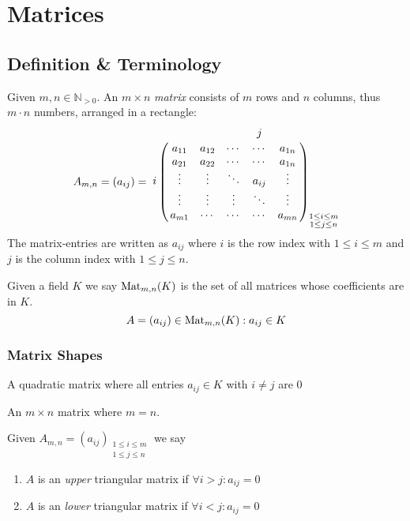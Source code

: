 \section{Matrices}
\subsection{Definition \& Terminology}
\begin{definition}[Matrix]
   Given \(m, n \in \mathbb{N}_{>0}\). An \(m \times n\) \emph{matrix} consists of \(m\) rows and \(n\) columns, thus \(m \cdot n\) numbers, arranged in a rectangle:
   \[
   A_{m,n} = (a_{ij}) =
   \bordermatrix{
      ~ & & & & j & \cr
        & a_{11} & a_{12} & \cdots & \cdots & a_{1n} \cr
        & a_{21} & a_{22} & \cdots & \cdots & a_{1n} \cr
      i & \vdots & \vdots & \ddots & a_{ij} & \vdots \cr
        & \vdots & \vdots & \vdots & \ddots & \vdots \cr
        & a_{m1} & \cdots & \cdots & \cdots & a_{mn} \cr
   }_{\substack{1 \leq i \leq m \\ 1 \leq j \leq n}}
   \]
   The matrix-entries are written as \(a_{ij}\) where \(i\) is the row index with \(1 \leq i \leq m\) and \(j\) is the column index with \(1 \leq j \leq n\).
\end{definition}
\begin{remark}[Notation]
   Given a field \(K\) we say \(\operatorname{Mat}_{m,n}(K)\) is the set of all matrices whose coefficients are in \(K\).
   \[A = (a_{ij}) \in \operatorname{Mat}_{m,n}(K): a_{ij} \in K\]
\end{remark}

\subsubsection{Matrix Shapes}
\begin{definition}
   A quadratic matrix where all entries \(a_{ij} \in K\) with \(i \neq j\) are \(0\)
\end{definition}

\begin{definition}
   An \(m \times n\) matrix where \(m = n\).
\end{definition}

\begin{definition}\label{def:triangular_matrix}
   Given \(A_{m,n} = (a_{ij})_{\substack{1 \leq i \leq m \\ 1 \leq j \leq n}}\) we say

   \begin{enumerate}[label=\roman*, align=Center]
      \item \(A\) is an \emph{upper} triangular matrix if \(\forall i > j: a_{ij} = 0\)
      \item \(A\) is an \emph{lower} triangular matrix if \(\forall i < j: a_{ij} = 0\)
   \end{enumerate}
\end{definition}

